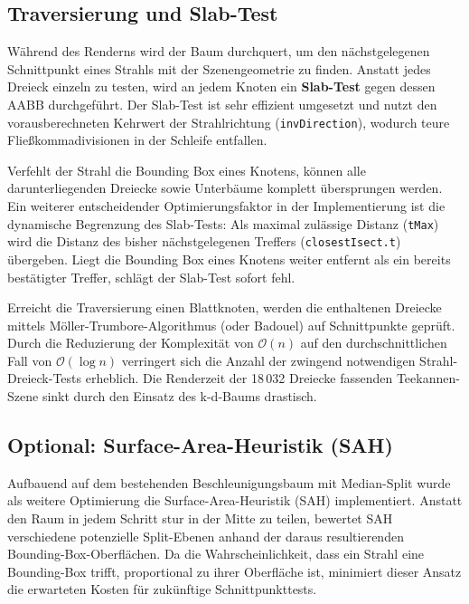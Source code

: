 \documentclass[11pt, a4paper]{article}
\begin{document}
\subsection{Traversierung und Slab-Test}

Während des Renderns wird der Baum durchquert, um den nächstgelegenen Schnittpunkt eines Strahls mit der Szenengeometrie zu finden. Anstatt jedes Dreieck einzeln zu testen, wird an jedem Knoten ein \textbf{Slab-Test} gegen dessen AABB durchgeführt. Der Slab-Test ist sehr effizient umgesetzt und nutzt den vorausberechneten Kehrwert der Strahlrichtung (\texttt{invDirection}), wodurch teure Fließkommadivisionen in der Schleife entfallen.

Verfehlt der Strahl die Bounding Box eines Knotens, können alle darunterliegenden Dreiecke sowie Unterbäume komplett übersprungen werden. Ein weiterer entscheidender Optimierungsfaktor in der Implementierung ist die dynamische Begrenzung des Slab-Tests: Als maximal zulässige Distanz (\texttt{tMax}) wird die Distanz des bisher nächstgelegenen Treffers (\texttt{closestIsect.t}) übergeben. Liegt die Bounding Box eines Knotens weiter entfernt als ein bereits bestätigter Treffer, schlägt der Slab-Test sofort fehl.

Erreicht die Traversierung einen Blattknoten, werden die enthaltenen Dreiecke mittels Möller-Trumbore-Algorithmus (oder Badouel) auf Schnittpunkte geprüft. Durch die Reduzierung der Komplexität von $\mathcal{O}(n)$ auf den durchschnittlichen Fall von $\mathcal{O}(\log n)$ verringert sich die Anzahl der zwingend notwendigen Strahl-Dreieck-Tests erheblich. Die Renderzeit der 18\,032 Dreiecke fassenden Teekannen-Szene sinkt durch den Einsatz des k-d-Baums drastisch.

\subsection{Optional: Surface-Area-Heuristik (SAH)}

Aufbauend auf dem bestehenden Beschleunigungsbaum mit Median-Split wurde als weitere Optimierung die Surface-Area-Heuristik (SAH) implementiert. Anstatt den Raum in jedem Schritt stur in der Mitte zu teilen, bewertet SAH verschiedene potenzielle Split-Ebenen anhand der daraus resultierenden Bounding-Box-Oberflächen. Da die Wahrscheinlichkeit, dass ein Strahl eine Bounding-Box trifft, proportional zu ihrer Oberfläche ist, minimiert dieser Ansatz die erwarteten Kosten für zukünftige Schnittpunkttests.
\end{document}

